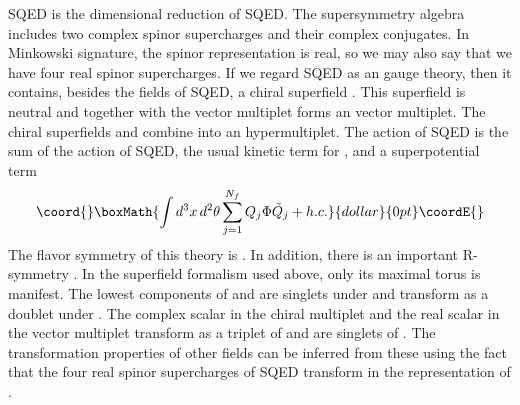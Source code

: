 \documentclass[a4paper,12pt, amsfonts, amssymb]{article}
\providecommand{\tQ}{{\tilde Q}}
\providecommand{\Q}{{\mathsf Q}}
\begin{document}
\coordHE{}  \coordHE{} SQED is the dimensional reduction of \coordHE{}  \coordHE{} SQED. The
supersymmetry algebra includes two complex spinor supercharges
\myHighlight{$\Q^i_\alpha,$}\coordHE{}  \coordHE{} and their complex conjugates. In Minkowski signature,
the spinor representation is real, so we may also say that we have four
real spinor supercharges. 
If we regard \coordHE{} SQED as an \coordHE{}  \coordHE{} gauge theory, then it contains, besides the fields of \coordHE{} SQED, a chiral superfield \myHighlight{$\Phi$}\coordHE{}. 
This superfield is neutral and together with the \coordHE{} vector multiplet \coordHE{} forms an \coordHE{} vector multiplet. The chiral superfields \coordHE{} and \myHighlight{$\tQ_j^\dag$}\coordHE{}
combine into an \coordHE{} hypermultiplet. The action of \coordHE{} SQED is the sum 
of the action of \coordHE{} SQED, the usual kinetic term for \myHighlight{$\Phi$}\coordHE{},
and a superpotential term
$$\coord{}\boxMath{
\int d^3x\, d^2\theta \sum_{j=1}^{N_f} Q_j\Phi \tQ_j + h.c.
}{dollar}{0pt}\coordE{}$$ 
The flavor symmetry of this theory is \coordHE{}. In addition, there
is an important R-symmetry \coordHE{}. In the \coordHE{} superfield
formalism used above, only its maximal torus \coordHE{} is manifest. 
The lowest components of \coordHE{} and \myHighlight{$\tQ^\dag$}\coordHE{} are singlets under \coordHE{}
and transform as a doublet under \coordHE{}. The complex scalar \myHighlight{$\Phi$}\coordHE{} in the
chiral multiplet and the real scalar \myHighlight{$\chi$}\coordHE{} in the \coordHE{} vector multiplet transform as a triplet of \coordHE{} and are singlets of \coordHE{}. 
The transformation properties of other fields can be inferred from these using the fact that the four real spinor supercharges of \coordHE{} SQED transform in the \coordHE{} representation of \coordHE{}. 
\end{document}
